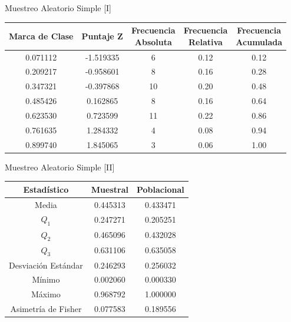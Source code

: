 \documentclass{beamer}
\begin{document}
    \begin{frame}{Muestreo Aleatorio Simple [I]}
        \begin{center}
            \begin{tabular}{|c|c|c|c|c|}
                \hline
                Marca de Clase & Puntaje Z & \makecell{Frecuencia\\Absoluta} & \makecell{Frecuencia\\Relativa} & \makecell{Frecuencia\\Acumulada} \\
                \hline
                0.071112 & -1.519335 & 6  & 0.12 & 0.12 \\
                0.209217 & -0.958601 & 8  & 0.16 & 0.28 \\
                0.347321 & -0.397868 & 10 & 0.20 & 0.48 \\
                0.485426 &  0.162865 & 8  & 0.16 & 0.64 \\
                0.623530 &  0.723599 & 11 & 0.22 & 0.86 \\
                0.761635 &  1.284332 & 4  & 0.08 & 0.94 \\
                0.899740 &  1.845065 & 3  & 0.06 & 1.00 \\
                \hline
            \end{tabular}
        \end{center} 
    \end{frame}
    
    \begin{frame}{Muestreo Aleatorio Simple [II]}
        \begin{center}
            \begin{tabular}{|c|cc|}
                \hline
                Estadístico & Muestral & Poblacional \\
                \hline
                Media & 0.445313 & 0.433471 \\
                $Q_1$ & 0.247271 & 0.205251 \\
                $Q_2$ & 0.465096 & 0.432028 \\
                $Q_3$ & 0.631106 & 0.635058 \\
                Desviación Estándar & 0.246293 & 0.256032 \\
                Mínimo & 0.002060 & 0.000330 \\
                Máximo & 0.968792 & 1.000000 \\
                Asimetría de Fisher & 0.077583 & 0.189556 \\
                \hline
                \end{tabular}
        \end{center}
    \end{frame}
\end{document}
